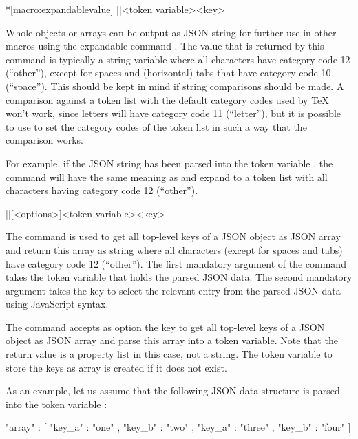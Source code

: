 \documentclass[a4paper]{article}
\begin{document}
{{\begin{macrodef}*[macro:expandablevalue]
|\JSONParseExpandableValue|{<token variable>}{<key>}
\end{macrodef}
Whole objects or arrays can be output as JSON string for further use in other macros using the expandable command \macro{\JSONParseExpandableValue}. The value that is returned by this command is typically a string variable where all characters have category code 12 (``other''), except for spaces and (horizontal) tabs that have category code 10 (``space''). This should be kept in mind if string comparisons should be made. A comparison against a token list with the default category codes used by TeX won't work, since letters will have category code 11 (``letter''), but it is possible to use \macro{\detokenize} to set the category codes of the token list in such a way that the comparison works.

For example, if the JSON string  has been parsed into the token variable \macro{\myJSONdata}, the command  will have the same meaning as  and expand to a token list with all characters having category code 12 (``other'').

\begin{macrodef}
|\JSONParseKeys|[<options>]{<token variable>}{<key>}
\end{macrodef}
The command \macro{\JSONParseKeys} is used to get all top-level keys of a JSON object as JSON array and return this array as string where all characters (except for spaces and tabs) have category code 12 (``other''). The first mandatory argument of the command takes the token variable that holds the parsed JSON data. The second mandatory argument takes the key to select the relevant entry from the parsed JSON data using JavaScript syntax.

The command \macro{\JSONParseKeys} accepts as option the key  to get all top-level keys of a JSON object as JSON array and parse this array into a token variable. Note that the return value is a property list in this case, not a string. The token variable to store the keys as array is created if it does not exist.

As an example, let us assume that the following JSON data structure is parsed into the token variable \macro{\myJSONdata}:

\begin{codeexample}
{
  "array" : [
    {
      "key_a" : "one" ,
      "key_b" : "two"
    } ,
    {
      "key_a" : "three" ,
      "key_b" : "four"
    }
  ]
}
\end{codeexample}

}}
\end{document}
